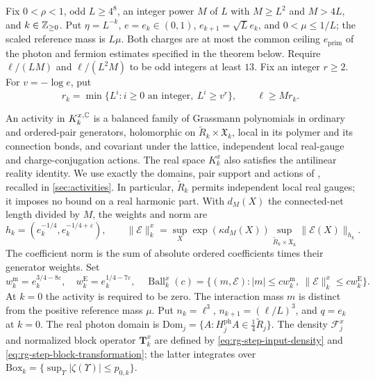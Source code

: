 Fix \(0<\rho<1\), odd \(L\ge4^8\), an integer power \(M\) of \(L\) with \(M\ge L^2\) and \(M>4L\),
and \(k\in\mathbb Z_{\ge0}\). Put \(\eta=L^{-k}\), \(e=e_k\in(0,1)\),
\(e_{k+1}=\sqrt L e_k\), and \(0<\mu\le1/L\); the scaled reference
mass is \(L\mu\). Both charges are at most the common ceiling $e_{\mathrm{prim}}$ of the
photon and fermion estimates specified in the theorem below. Require
\(\ell/(LM)\) and \(\ell/(L^2M)\) to be odd integers at least \(13\).
Fix an integer \(r\ge2\). For \(v=-\log e\), put
\[
 r_k=\min\{L^i:i\ge0\text{ an integer},\ L^i\ge v^r\},
 \qquad \ell\ge Mr_k .
\]



An activity in $K_k^{x,\mathbb C}$ is a balanced family of Grassmann
polynomials in ordinary and ordered-pair generators, holomorphic on
$\widetilde R_k\times\mathfrak X_k$, local in its polymer and its
connection bonds, and covariant under the lattice, independent local
real-gauge and charge-conjugation actions. The real space $K_k^x$
also satisfies the antilinear reality identity. We use exactly the
domains, pair support and actions of \cite[\S2]{NormalizedContraction},
recalled in \cref{sec:activities}. In particular, $\widetilde R_k$
permits independent local real gauges; it imposes no bound on a real
harmonic part. With $d_M(X)$ the connected-net length divided by $M$,
the weights and norm are
\[
 h_k=(e_k^{-1/4},e_k^{-1/4+\varepsilon}),\qquad
 \|\mathscr E\|_k^x=\sup_X\exp(\kappa d_M(X))
       \sup_{\widetilde R_k\times\mathfrak X_k}\|\mathscr E(X)\|_{h_k}.
\]
The coefficient norm is the sum of absolute ordered coefficients
times their generator weights. Set
\begin{equation}\label{eq:rg-windows}
 w_k^{\mathrm m}=e_k^{3/4-8\varepsilon},\quad
 w_k^{\mathrm E}=e_k^{1/4-7\varepsilon},\quad
 \operatorname{Ball}_k^x(c)=
 \{(m,\mathscr E):|m|\le cw_k^{\mathrm m},\
                 \|\mathscr E\|_k^x\le cw_k^{\mathrm E}\}.
\end{equation}
At $k=0$ the activity is required to be zero. The interaction mass
$m$ is distinct from the positive reference mass $\mu$. Put
$n_k=\ell^3$, $n_{k+1}=(\ell/L)^3$, and $q=e_k$ at $k=0$.
The real photon domain is
$\mathrm{Dom}_j=\{A:H_j^{\mathrm{ph}}A\in\frac14\widetilde R_j\}$.
The density $\mathscr F_j^x$ and normalized block operator $\mathbf T_k^x$
are defined by \eqref{eq:rg-step-input-density} and
\eqref{eq:rg-step-block-transformation}; the latter integrates over
$\mathrm{Box}_k=\{\sup_\Upsilon|\zeta(\Upsilon)|\le p_{0,k}\}$.

